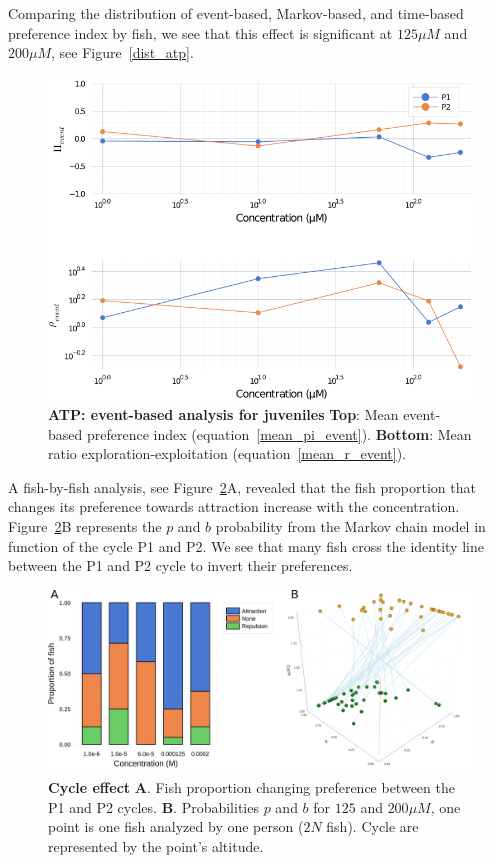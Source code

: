   Comparing the distribution of event-based, Markov-based, and time-based preference index by fish, we see that this effect is significant at $125 \mu M$ and  $200 \mu M$, see Figure~\ref{dist_atp}.

    \begin{figure}[h!]
      \centering
      \includegraphics[width=1\textwidth]{part_2/assets/atp_event.png}
      \caption{\textbf{ATP: event-based analysis for juveniles} \textbf{Top}: Mean event-based preference index (equation~\ref{mean_pi_event}). \textbf{Bottom}: Mean ratio exploration-exploitation (equation~\ref{mean_r_event}).}
      \label{atp_event}
    \end{figure}

  A fish-by-fish analysis, see Figure~\ref{proportion}A, revealed that the fish proportion that changes its preference towards attraction increase with the concentration. Figure~\ref{proportion}B represents the $p$ and $b$ probability from the Markov chain model in function of the cycle P1 and P2. We see that many fish cross the identity line between the P1 and P2 cycle to invert their preferences.

    \begin{figure}[h!]
      \centering
      \includegraphics[width=1\textwidth]{part_2/assets/proportion.png}
      \caption{\textbf{Cycle effect} \textbf{A}. Fish proportion changing preference between the P1 and P2 cycles. \textbf{B}. Probabilities $p$ and $b$ for $125$ and $200 \mu M$, one point is one fish analyzed by one person ($2N$ fish). Cycle are represented by the point's altitude.}
      \label{proportion}
    \end{figure}

